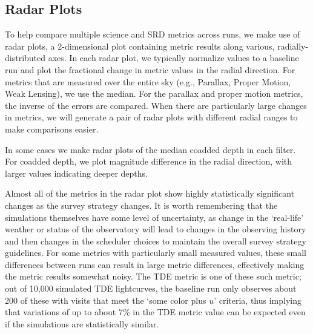 \subsection{Radar Plots}

To help compare multiple science and SRD metrics across runs, we make use of radar plots, a 2-dimensional plot containing metric results along various, radially-distributed axes. In each radar plot, we typically normalize values to a baseline run and plot the fractional change in metric values in the radial direction. For metrics that are measured over the entire sky (e.g., Parallax, Proper Motion, Weak Lensing), we use the median. For the parallax and proper motion metrics, the inverse of the errors are compared. When there are particularly large changes in metrics, we will generate a pair of radar plots with different radial ranges to make comparisons easier.

In some cases we make radar plots of the median coadded depth in each filter. For coadded depth, we plot magnitude difference in the radial direction, with larger values indicating deeper depths. 

Almost all of the metrics in the radar plot show highly statistically significant changes as the survey strategy changes. It is worth remembering that the simulations themselves have some level of uncertainty, as change in the `real-life' weather or status of the observatory will lead to changes in the observing history and then changes in the scheduler choices to maintain the overall survey strategy guidelines. For some metrics with particularly small measured values, these small differences between runs can result in large metric differences, effectively making the metric results somewhat noisy. The TDE metric is one of these such metric; out of 10,000 simulated TDE lightcurves, the baseline run only observes about 200 of these with visits that meet the `some color plus $u$' criteria, thus implying that variations of up to about 7\% in the TDE metric value can be expected even if the simulations are statistically similar.

